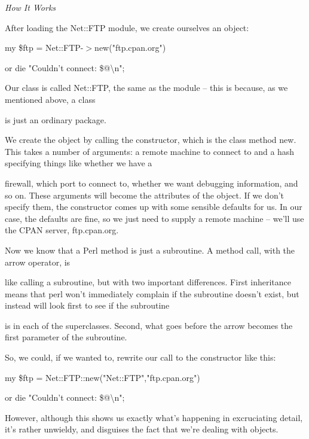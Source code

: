 \documentclass[a4paper,11pt]{book}
\begin{document}
\noindent \textit{How It Works}

\noindent After loading the Net::FTP module, we create ourselves an object:

\noindent 

\noindent my \$ftp = Net::FTP-$>$new("ftp.cpan.org")

\noindent or die "Couldn't connect: \$@\textbackslash n";

\noindent 

\noindent Our class is called Net::FTP, the same as the module -- this is because, as we mentioned above, a class

\noindent is just an ordinary package.

\noindent 

\noindent We create the object by calling the constructor, which is the class method new. This takes a number of arguments: a remote machine to connect to and a hash specifying things like whether we have a

\noindent firewall, which port to connect to, whether we want debugging information, and so on. These arguments will become the attributes of the object. If we don't specify them, the constructor comes up with some sensible defaults for us. In our case, the defaults are fine, so we just need to supply a remote machine -- we'll use the CPAN server, ftp.cpan.org.

\noindent 

\noindent Now  we know  that a Perl  method  is  just  a  subroutine.  A  method  call,  with  the  arrow  operator,  is

\noindent like  calling  a subroutine,  but with  two  important  differences.  First  inheritance  means  that  perl  won't immediately  complain  if the subroutine  doesn't  exist,  but  instead  will  look  first  to  see if  the  subroutine

\noindent is  in each of the superclasses.  Second,  what  goes  before  the  arrow  becomes  the first  parameter  of the subroutine.

\noindent 

\noindent So, we could, if we wanted to, rewrite our call to the constructor like this:

\noindent 

\noindent my \$ftp = Net::FTP::new("Net::FTP","ftp.cpan.org")

\noindent or die "Couldn't connect: \$@\textbackslash n";

\noindent 

\noindent However, although this shows us exactly what's happening in excruciating detail, it's rather unwieldy, and disguises the fact that we're dealing with objects.
\end{document}
